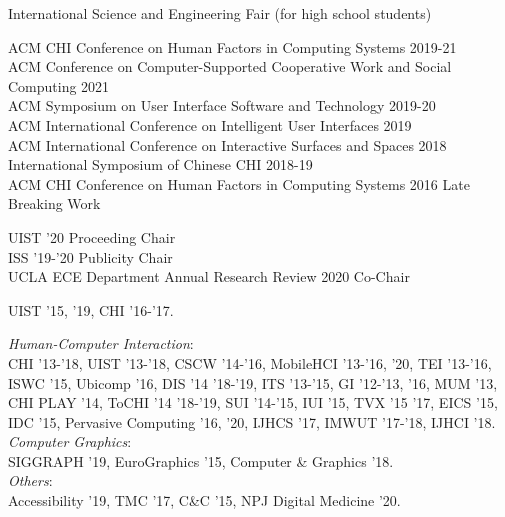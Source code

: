 

 {
	 {
			International Science and Engineering Fair (for high school students)
		}
}

 {
}

 {
	 {
		ACM CHI Conference on Human Factors in Computing Systems 2019-21\\
		ACM Conference on Computer-Supported Cooperative Work and Social Computing 2021\\
		ACM Symposium on User Interface Software and Technology 2019-20\\
		ACM International Conference on Intelligent User Interfaces 2019\\
		ACM International Conference on Interactive Surfaces and Spaces 2018\\
		International Symposium of Chinese CHI 2018-19\\
		ACM CHI Conference on Human Factors in Computing Systems 2016 Late Breaking Work
	}
}

 {
	 {
		UIST '20 Proceeding Chair\\
		ISS '19-'20 Publicity Chair\\
		UCLA ECE Department Annual Research Review 2020 Co-Chair
	}
}

 {
	 {
		UIST '15, '19, CHI '16-'17.
	}
}

 {
	 {
	\textit{Human-Computer Interaction}:\\
		CHI '13-'18, UIST '13-'18, CSCW '14-'16, MobileHCI '13-'16, '20, TEI '13-'16, ISWC '15, Ubicomp '16, DIS '14 '18-'19, ITS '13-'15, GI '12-'13, '16, MUM '13, CHI PLAY '14, ToCHI '14 '18-'19, SUI '14-'15, IUI '15, TVX '15 '17, EICS '15, IDC '15, Pervasive Computing '16, '20, IJHCS '17, IMWUT '17-'18, IJHCI '18. \vspace{0.5em}\\
		\textit{Computer Graphics}:\\
		SIGGRAPH '19,  EuroGraphics '15, Computer \& Graphics '18. \vspace{0.5em}\\
		\textit{Others}:\\
		Accessibility '19, TMC '17, C\&C '15, NPJ Digital Medicine '20.
	}
}

